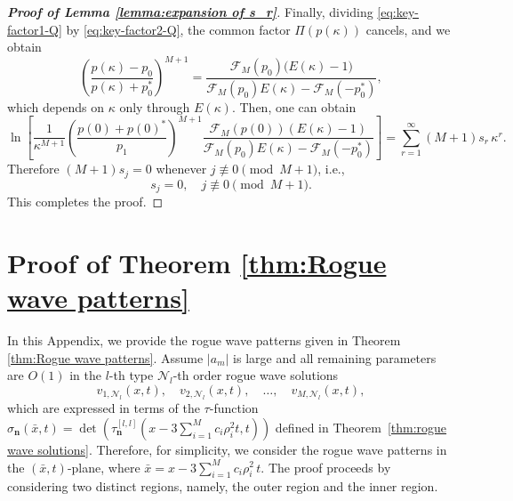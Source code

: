 \documentclass[preprint,3p,10pt]{elsarticle}
\theoremstyle{definition}
\begin{document}
\begin{proof}[\bf Proof of Lemma \ref{lemma:expansion of s_r}]
 
Finally, dividing \eqref{eq:key-factor1-Q} by
\eqref{eq:key-factor2-Q}, the common factor
\(\Pi(p(\kappa))\) cancels, and we obtain
\begin{equation}\label{eq:final-ratio-s}
\left(
\frac{p(\kappa)-p_0}{p(\kappa)+p_0^*}
\right)^{M+1}
=
\frac{
\mathcal F_M(p_0)\bigl(E(\kappa)-1\bigr)
}{
\mathcal F_M(p_0)E(\kappa)-\mathcal F_M(-p_0^*)
},
\end{equation}
which depends on $\kappa$ only through $E(\kappa)$. Then, one can obtain \begin{equation}
\ln\!\left[\frac{1}{\kappa^{M+1}}
\left(\frac{p(0)+p(0)^*}{p_1}\right)^{M+1}
\frac{ \mathcal{F}_M(p(0)) (E(\kappa)-1)}{\mathcal{F}_M(p_0)E(\kappa)-\mathcal{F}_M(-p_0^*)}\right]
=\sum_{r=1}^{\infty}(M+1)s_r\,\kappa^r.
\end{equation}
Therefore $(M+1)s_j=0$ whenever $j\not\equiv0\pmod{M+1}$, i.e.,
\begin{equation}
    s_j=0,\quad j\not\equiv0\pmod{M+1}.
\end{equation}
This completes the proof.

\end{proof}


\section{Proof of Theorem \ref{thm:Rogue wave patterns}}
In this Appendix, we provide the rogue wave patterns given in Theorem \ref{thm:Rogue wave patterns}. Assume $\left|a_m\right|$ is large and all remaining parameters are $O(1)$ in the $l$-th type $\mathcal{N}_l$-th order rogue wave solutions
\begin{equation} 
  v_{1,\mathcal{N}_l}(x,t), \quad
  v_{2,\mathcal{N}_l}(x,t), \quad
  \ldots, \quad
  v_{M,\mathcal{N}_l}(x,t),
\end{equation}
which are expressed in terms of the $\tau$-function $\sigma_{\mathbf{n}}(\bar{x},t)=\det\left(\tau_{\mathbf{n}}^{[l,l]}\left(x-3\sum_{i=1}^{M}c_i \rho_i^2 t,t\right)\right)$ defined in Theorem~\ref{thm:rogue wave solutions}. Therefore,  for simplicity, we consider the rogue wave patterns in the \((\bar{x},t)\)-plane, where $\bar{x}=x-3\sum_{i=1}^{M}c_i \rho_i^2\, t$. 
The proof proceeds by considering two distinct regions, namely, the outer region and the inner region.
\end{document}
